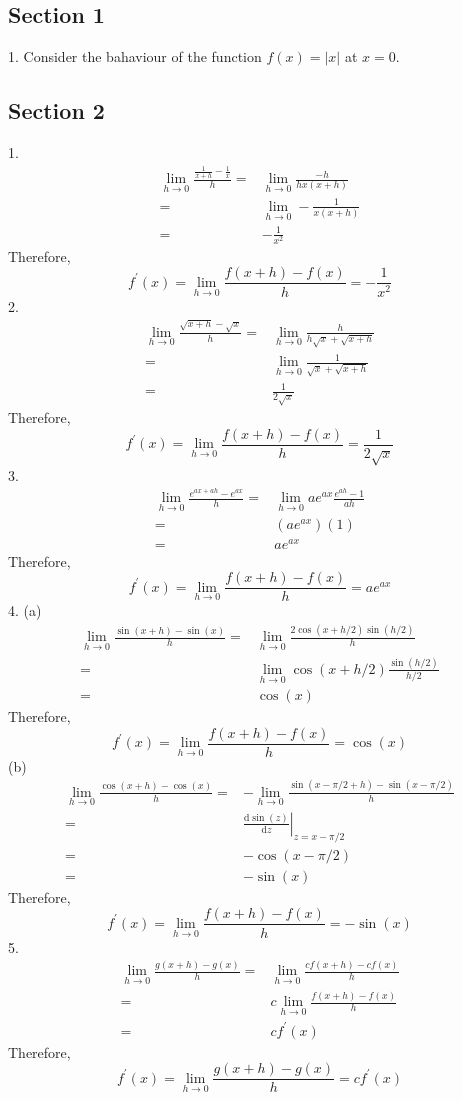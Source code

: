 \subsection{Section 1}
1. Consider the bahaviour of the function $f(x)=|x|$ at $x=0$.

\subsection{Section 2}
1.
\begin{align*}
    \lim_{h\to0}\frac{\frac{1}{x+h}-\frac{1}{x}}{h}
    =&\lim_{h\to0}\frac{-h}{hx(x+h)}\\
    =&\lim_{h\to0}-\frac{1}{x(x+h)}\\
    =&-\frac{1}{x^2}
\end{align*}
Therefore,
$$f^\prime(x)=\lim_{h\to0}\frac{f(x+h)-f(x)}{h}=-\frac{1}{x^2}$$
2.
\begin{align*}
    \lim_{h\to0}\frac{\sqrt{x+h}-\sqrt{x}}{h}
    =&\lim_{h\to0}\frac{h}{h\sqrt{x}+\sqrt{x+h}}\\
    =&\lim_{h\to0}\frac{1}{\sqrt{x}+\sqrt{x+h}}\\
    =&\frac{1}{2\sqrt{x}}
\end{align*}
Therefore,
$$f^\prime(x)=\lim_{h\to0}\frac{f(x+h)-f(x)}{h}=\frac{1}{2\sqrt{x}}$$
3.
\begin{align*}
    \lim_{h\to0}\frac{e^{ax+ah}-e^{ax}}{h}
    =&\lim_{h\to0}ae^{ax}\frac{e^{ah}-1}{ah}\\
    =&(ae^{ax})(1)\\
    =&ae^{ax}
\end{align*}
Therefore,
$$f^\prime(x)=\lim_{h\to0}\frac{f(x+h)-f(x)}{h}=ae^{ax}$$
4. (a)
\begin{align*}
    \lim_{h\to0}\frac{\sin(x+h)-\sin(x)}{h}
    =&\lim_{h\to0}\frac{2\cos(x+h/2)\sin(h/2)}{h}\\
    =&\lim_{h\to0}\cos(x+h/2)\frac{\sin(h/2)}{h/2}\\
    =&\cos(x)
\end{align*}
Therefore,
$$f^\prime(x)=\lim_{h\to0}\frac{f(x+h)-f(x)}{h}=\cos(x)$$
(b)
\begin{align*}
    \lim_{h\to0}\frac{\cos(x+h)-\cos(x)}{h}
    =&-\lim_{h\to0}\frac{\sin(x-\pi/2+h)-\sin(x-\pi/2)}{h}\\
    =&\left.\frac{\mathrm d\sin(z)}{\mathrm dz}\right|_{z=x-\pi/2}\\
    =&-\cos(x-\pi/2)\\
    =&-\sin(x)
\end{align*}
Therefore,
$$f^\prime(x)=\lim_{h\to0}\frac{f(x+h)-f(x)}{h}=-\sin(x)$$
5.
\begin{align*}
    \lim_{h\to0}\frac{g(x+h)-g(x)}{h}
    =&\lim_{h\to0}\frac{cf(x+h)-cf(x)}{h}\\
    =&c\lim_{h\to0}\frac{f(x+h)-f(x)}{h}\\
    =&cf^\prime(x)
\end{align*}
Therefore,
$$f^\prime(x)=\lim_{h\to0}\frac{g(x+h)-g(x)}{h}=cf^\prime(x)$$
